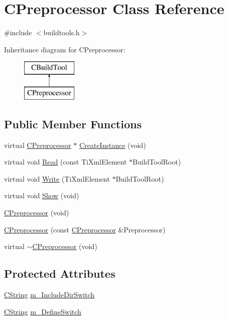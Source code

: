 \hypertarget{classCPreprocessor}{\section{C\-Preprocessor Class Reference}
\label{classCPreprocessor}
}


{\ttfamily \#include $<$buildtools.\-h$>$}

Inheritance diagram for C\-Preprocessor\-:\begin{figure}[H]
\begin{center}
\leavevmode
\includegraphics[height=2.000000cm]{d8/d20/classCPreprocessor}
\end{center}
\end{figure}
\subsection*{Public Member Functions}
\begin{DoxyCompactItemize}
\item 
virtual \hyperlink{classCPreprocessor}{C\-Preprocessor} $\ast$ \hyperlink{classCPreprocessor_af3308b7a4153f39320345f12f3da231c}{Create\-Instance} (void)
\item 
virtual void \hyperlink{classCPreprocessor_a30e3222f8d535865ef691d922ec4615e}{Read} (const Ti\-Xml\-Element $\ast$Build\-Tool\-Root)
\item 
virtual void \hyperlink{classCPreprocessor_abe0fdbf2737d9acb4472ad0b40026938}{Write} (Ti\-Xml\-Element $\ast$Build\-Tool\-Root)
\item 
virtual void \hyperlink{classCPreprocessor_a42b578669033aae20b4f1a2d90f922dc}{Show} (void)
\item 
\hyperlink{classCPreprocessor_aad88f47e5c2c676f92a309882a880f73}{C\-Preprocessor} (void)
\item 
\hyperlink{classCPreprocessor_a7537e6ef4aa89a03715690bef58c601a}{C\-Preprocessor} (const \hyperlink{classCPreprocessor}{C\-Preprocessor} \&Preprocessor)
\item 
virtual \hyperlink{classCPreprocessor_ad8f8a115c64500fe449b3617adec94d5}{$\sim$\-C\-Preprocessor} (void)
\end{DoxyCompactItemize}
\subsection*{Protected Attributes}
\begin{DoxyCompactItemize}
\item 
\hyperlink{classCString}{C\-String} \hyperlink{classCPreprocessor_ad190e628e9b0186fa5fc263241656fba}{m\-\_\-\-Include\-Dir\-Switch}
\item 
\hyperlink{classCString}{C\-String} \hyperlink{classCPreprocessor_a5853038e3b47df3c828f65b02f4c7917}{m\-\_\-\-Define\-Switch}
\end{DoxyCompactItemize}

